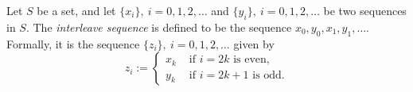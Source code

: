 \documentclass[12pt]{article}
\begin{document}
Let $S$ be a set, and let $\{x_i\},\ i=0,1,2,\dots$ and $\{y_i\},\ i=0,1,2,\dots$ be two sequences in $S$. The {\em interleave sequence} is defined to be the sequence $x_0, y_0, x_1, y_1, \dots$. Formally, it is the sequence $\{z_i\},\ i=0,1,2,\dots$ given by
$$
z_i :=
\begin{cases}
x_k & \text{\ \ if } i=2k \text{ is even,}\\
y_k & \text{\ \ if } i=2k+1 \text{ is odd.}
\end{cases}
$$
\end{document}
